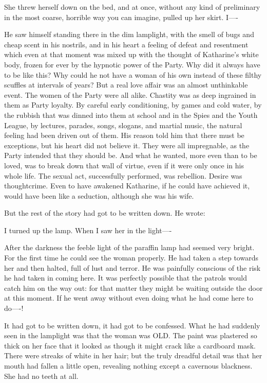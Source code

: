 \documentclass{article}
\begin{document}
   She threw herself down on the bed, and at once, without any kind of
preliminary in the most coarse, horrible way you can imagine, pulled up
her skirt. I----


He saw himself standing there in the dim lamplight, with the smell of bugs
and cheap scent in his nostrils, and in his heart a feeling of defeat and
resentment which even at that moment was mixed up with the thought of
Katharine's white body, frozen for ever by the hypnotic power of the Party.
Why did it always have to be like this? Why could he not have a woman of
his own instead of these filthy scuffles at intervals of years? But a real
love affair was an almost unthinkable event. The women of the Party were
all alike. Chastity was as deep ingrained in them as Party loyalty. By
careful early conditioning, by games and cold water, by the rubbish that
was dinned into them at school and in the Spies and the Youth League, by
lectures, parades, songs, slogans, and martial music, the natural feeling
had been driven out of them. His reason told him that there must be
exceptions, but his heart did not believe it. They were all impregnable,
as the Party intended that they should be. And what he wanted, more even
than to be loved, was to break down that wall of virtue, even if it were
only once in his whole life. The sexual act, successfully performed, was
rebellion. Desire was thoughtcrime. Even to have awakened Katharine, if he
could have achieved it, would have been like a seduction, although she was
his wife.

But the rest of the story had got to be written down. He wrote:


   I turned up the lamp. When I saw her in the light----


After the darkness the feeble light of the paraffin lamp had seemed very
bright. For the first time he could see the woman properly. He had taken a
step towards her and then halted, full of lust and terror. He was painfully
conscious of the risk he had taken in coming here. It was perfectly
possible that the patrols would catch him on the way out: for that matter
they might be waiting outside the door at this moment. If he went away
without even doing what he had come here to do----!

It had got to be written down, it had got to be confessed. What he had
suddenly seen in the lamplight was that the woman was OLD. The paint was
plastered so thick on her face that it looked as though it might crack
like a cardboard mask. There were streaks of white in her hair; but the
truly dreadful detail was that her mouth had fallen a little open,
revealing nothing except a cavernous blackness. She had no teeth at all.
\end{document}
